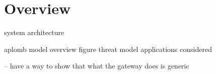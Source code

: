 \section{Overview}\label{sec:overview}

system architecture 

aplomb model
overview figure
threat model
applications considered

   -- have a way to show that what the gateway does is generic 
